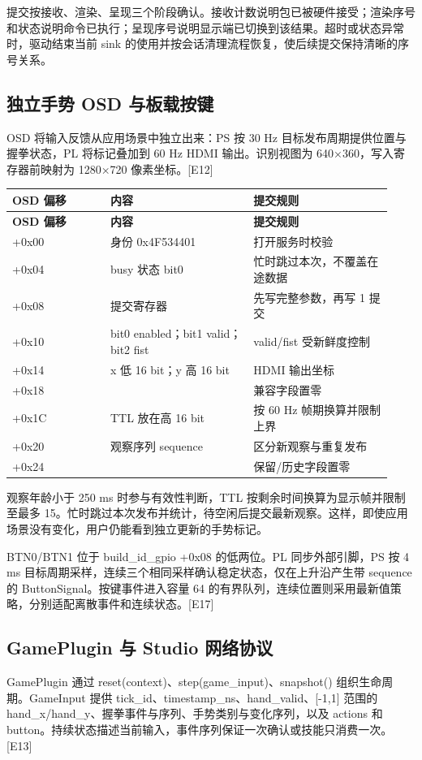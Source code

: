 提交按接收、渲染、呈现三个阶段确认。接收计数说明包已被硬件接受；渲染序号和状态说明命令已执行；呈现序号说明显示端已切换到该结果。超时或状态异常时，驱动结束当前 sink 的使用并按会话清理流程恢复，使后续提交保持清晰的序号关系。

\subsection{独立手势 OSD 与板载按键}
OSD 将输入反馈从应用场景中独立出来：PS 按 30 Hz 目标发布周期提供位置与握拳状态，PL 将标记叠加到 60 Hz HDMI 输出。识别视图为 640×360，写入寄存器前映射为 1280×720 像素坐标。[E12]

{\small\renewcommand{\arraystretch}{1.28}
\begin{longtable}{@{}>{\raggedright\arraybackslash}p{0.24\linewidth}>{\raggedright\arraybackslash}p{0.35\linewidth}>{\raggedright\arraybackslash}p{0.34\linewidth}@{}}
\toprule
\bfseries OSD 偏移 & \bfseries 内容 & \bfseries 提交规则\\\midrule
\endfirsthead
\toprule
\bfseries OSD 偏移 & \bfseries 内容 & \bfseries 提交规则\\\midrule
\endhead
\bottomrule\endfoot
+0x00 & 身份 0x4F534401 & 打开服务时校验\\
+0x04 & busy 状态 bit0 & 忙时跳过本次，不覆盖在途数据\\
+0x08 & 提交寄存器 & 先写完整参数，再写 1 提交\\
+0x10 & bit0 enabled；bit1 valid；bit2 fist & valid/fist 受新鲜度控制\\
+0x14 & x 低 16 bit；y 高 16 bit & HDMI 输出坐标\\
+0x18 & 0 & 兼容字段置零\\
+0x1C & TTL 放在高 16 bit & 按 60 Hz 帧期换算并限制上界\\
+0x20 & 观察序列 sequence & 区分新观察与重复发布\\
+0x24 & 0 & 保留/历史字段置零\\
\end{longtable}}
观察年龄小于 250 ms 时参与有效性判断，TTL 按剩余时间换算为显示帧并限制至最多 15。忙时跳过本次发布并统计，待空闲后提交最新观察。这样，即使应用场景没有变化，用户仍能看到独立更新的手势标记。

BTN0/BTN1 位于 build\_id\_gpio +0x08 的低两位。PL 同步外部引脚，PS 按 4 ms 目标周期采样，连续三个相同采样确认稳定状态，仅在上升沿产生带 sequence 的 ButtonSignal。按键事件进入容量 64 的有界队列，连续位置则采用最新值策略，分别适配离散事件和连续状态。[E17]

\subsection{GamePlugin 与 Studio 网络协议}
GamePlugin 通过 reset(context)、step(game\_input)、snapshot() 组织生命周期。GameInput 提供 tick\_id、timestamp\_ns、hand\_valid、[-1,1] 范围的 hand\_x/hand\_y、握拳事件与序列、手势类别与变化序列，以及 actions 和 button。持续状态描述当前输入，事件序列保证一次确认或技能只消费一次。[E13]

